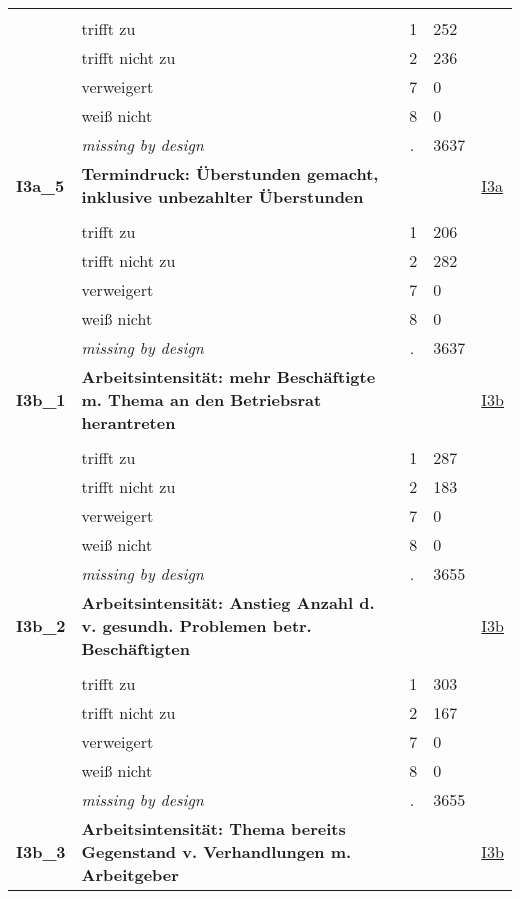 \begin{longtable}{| L{2.65cm} | L{8cm} | C{1.5cm} | R{1.25cm} | C{2.25cm}  |}
   &  &  &  &  \\ 
   & trifft zu & 1 & 252 &  \\ 
   & trifft nicht zu & 2 & 236 &  \\ 
   & verweigert & 7 & 0 &  \\ 
   & weiß nicht & 8 & 0 &  \\ 
   & \textit{missing by design} & \textit{.} & 3637 &  \\ 
   \midrule
\textbf{I3a\_5}\label{var:I3a:5} & \textbf{Termindruck: Überstunden gemacht, inklusive unbezahlter Überstunden} &  &  & \hyperref[I3a]{I3a} \\ 
   &  &  &  &  \\ 
   & trifft zu & 1 & 206 &  \\ 
   & trifft nicht zu & 2 & 282 &  \\ 
   & verweigert & 7 & 0 &  \\ 
   & weiß nicht & 8 & 0 &  \\ 
   & \textit{missing by design} & \textit{.} & 3637 &  \\ 
   \midrule
\textbf{I3b\_1}\label{var:I3b:1} & \textbf{Arbeitsintensität: mehr Beschäftigte m. Thema an den Betriebsrat herantreten} &  &  & \hyperref[I3b]{I3b} \\ 
   &  &  &  &  \\ 
   & trifft zu & 1 & 287 &  \\ 
   & trifft nicht zu & 2 & 183 &  \\ 
   & verweigert & 7 & 0 &  \\ 
   & weiß nicht & 8 & 0 &  \\ 
   & \textit{missing by design} & \textit{.} & 3655 &  \\ 
   \midrule
\textbf{I3b\_2}\label{var:I3b:2} & \textbf{Arbeitsintensität: Anstieg Anzahl d. v. gesundh. Problemen betr. Beschäftigten} &  &  & \hyperref[I3b]{I3b} \\ 
   &  &  &  &  \\ 
   & trifft zu & 1 & 303 &  \\ 
   & trifft nicht zu & 2 & 167 &  \\ 
   & verweigert & 7 & 0 &  \\ 
   & weiß nicht & 8 & 0 &  \\ 
   & \textit{missing by design} & \textit{.} & 3655 &  \\ 
   \midrule
\textbf{I3b\_3}\label{var:I3b:3} & \textbf{Arbeitsintensität: Thema bereits Gegenstand v. Verhandlungen m. Arbeitgeber} &  &  & \hyperref[I3b]{I3b} \\ 

\end{longtable}
